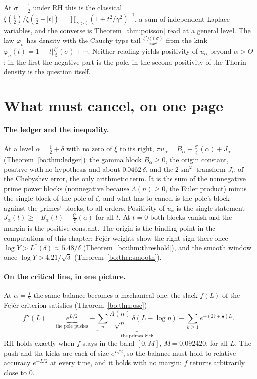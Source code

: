 At $\sigma=\frac12$ under RH this is the classical $\xi(\frac12)/\xi(\frac12+|t|)=\prod_{\gamma>0}(1+t^2/\gamma^2)^{-1}$, a sum of independent Laplace variables, and the converse is Theorem~\ref{thm:poisson} read at a general level. The law $\varphi_\sigma$ has density with the Cauchy type tail $\frac{\xi'/\xi(\sigma)}{\pi x^2}$ from the kink $\varphi_\sigma(t)=1-|t|\frac{\xi'}{\xi}(\sigma)+\cdots$. Neither reading yields positivity of $u_\alpha$ beyond $\alpha>\Theta$: in the first the negative part is the pole, in the second positivity of the Thorin density is the question itself.

\section{What must cancel, on one page}\label{bo:sec:cancel}

\paragraph{The ledger and the inequality.} At a level $\alpha=\frac12+\delta$ with no zero of $\xi$ to its right, $\pi u_\alpha=B_\alpha+\frac{\xi'}{\xi}(\alpha)+J_\alpha$ (Theorem~\ref{bo:thm:ledger}): the gamma block $B_\alpha\ge0$, the origin constant, positive with no hypothesis and about $0.0462\,\delta$, and the $2\sin^2$ transform $J_\alpha$ of the Chebyshev error, the only arithmetic term. It is the sum of the nonnegative prime power blocks (nonnegative because $\Lambda(n)\ge0$, the Euler product) minus the single block of the pole of $\zeta$, and what has to cancel is the pole's block against the primes' blocks, to all orders. Positivity of $u_\alpha$ is the single statement $J_\alpha(t)\ge-B_\alpha(t)-\frac{\xi'}{\xi}(\alpha)$ for all $t$. At $t=0$ both blocks vanish and the margin is the positive constant. The origin is the binding point in the computations of this chapter: Fej\'er weights show the right sign there once $\log Y>L^*(\delta)\approx5.48/\delta$ (Theorem~\ref{bo:thm:threshold}), and the smooth window once $\log Y>4.21/\sqrt\delta$ (Theorem~\ref{bo:thm:smooth}).

\paragraph{On the critical line, in one picture.} At $\alpha=\frac12$ the same balance becomes a mechanical one: the slack $f(L)$ of the Fej\'er criterion satisfies (Theorem~\ref{bo:thm:osc})
\[
f''(L)=\underbrace{e^{L/2}}_{\text{the pole pushes}}-\underbrace{\sum_n\frac{\Lambda(n)}{\sqrt n}\,\delta(L-\log n)}_{\text{the primes kick}}-\sum_{k\ge1}e^{-(2k+\frac12)L}.
\]
RH holds exactly when $f$ stays in the band $[0,M]$, $M=0.092420$, for all $L$. The push and the kicks are each of size $e^{L/2}$, so the balance must hold to relative accuracy $e^{-L/2}$ at every time, and it holds with no margin: $f$ returns arbitrarily close to $0$.
